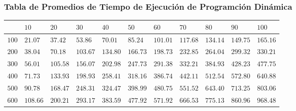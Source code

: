 \documentclass[12pt]{article}
\begin{document}
\subsubsection*{Tabla de Promedios de Tiempo de Ejecuci\'on de Programci\'on Din\'amica}
\begin{tabu}{|@{}*{11}{p{1.4cm}@{}|}}
%
& $10$ & $20$ & $30$ & $40$ & $50$ & $60$ & $70$ & $80$ & $90$ & $100$ \\\hline
$100$ & $21.07$ & $37.42$ & $53.86$ & $70.01$ & $85.24$ & $101.01$ & $117.68$ & $134.14$ & $149.75$ & $165.16$ \\\hline
$200$ & $38.04$ & $70.18$ & $103.67$ & $134.80$ & $166.73$ & $198.73$ & $232.85$ & $264.04$ & $299.32$ & $330.21$ \\\hline
$300$ & $56.01$ & $105.58$ & $156.07$ & $202.98$ & $247.73$ & $291.38$ & $332.21$ & $384.93$ & $428.23$ & $477.75$ \\\hline
$400$ & $71.73$ & $133.93$ & $198.93$ & $258.41$ & $318.16$ & $386.74$ & $442.11$ & $512.54$ & $572.80$ & $640.88$ \\\hline
$500$ & $90.78$ & $168.47$ & $248.31$ & $324.47$ & $398.99$ & $480.75$ & $551.52$ & $643.40$ & $713.25$ & $803.06$ \\\hline
$600$ & $108.66$ & $200.21$ & $293.17$ & $383.59$ & $477.92$ & $571.92$ & $666.53$ & $775.13$ & $860.96$ & $968.48$ \\\hline

\end{tabu}
\end{document}
